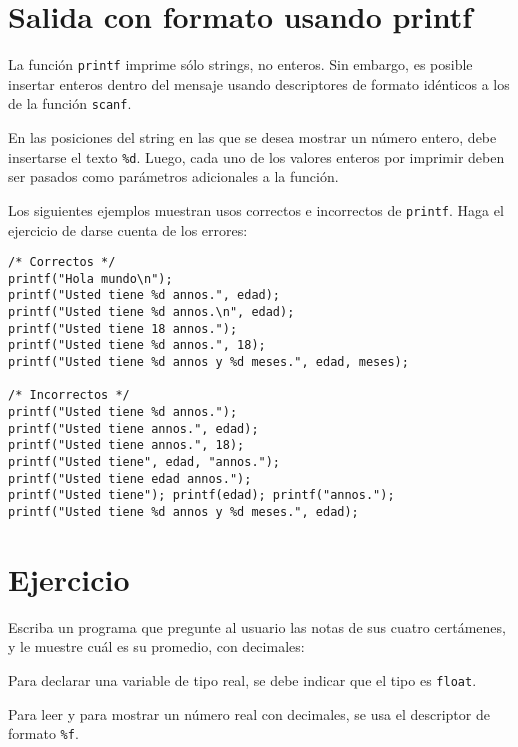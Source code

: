 \section{Salida con formato usando printf}

La función \lstinline!printf! imprime sólo strings, no enteros. Sin
embargo, es posible insertar enteros dentro del mensaje usando
descriptores de formato idénticos a los de la función \lstinline!scanf!.

En las posiciones del string en las que se desea mostrar un número
entero, debe insertarse el texto \lstinline!%d!. Luego, cada uno de los
valores enteros por imprimir deben ser pasados como parámetros
adicionales a la función.

Los siguientes ejemplos muestran usos correctos e incorrectos de
\lstinline!printf!. Haga el ejercicio de darse cuenta de los errores:

\begin{lstlisting}
/* Correctos */
printf("Hola mundo\n");
printf("Usted tiene %d annos.", edad);
printf("Usted tiene %d annos.\n", edad);
printf("Usted tiene 18 annos.");
printf("Usted tiene %d annos.", 18);
printf("Usted tiene %d annos y %d meses.", edad, meses);

/* Incorrectos */
printf("Usted tiene %d annos.");
printf("Usted tiene annos.", edad);
printf("Usted tiene annos.", 18);
printf("Usted tiene", edad, "annos.");
printf("Usted tiene edad annos.");
printf("Usted tiene"); printf(edad); printf("annos.");
printf("Usted tiene %d annos y %d meses.", edad);
\end{lstlisting}

\section{Ejercicio}

Escriba un programa que pregunte al usuario las notas de sus cuatro
certámenes, y le muestre cuál es su promedio, con decimales:

Para declarar una variable de tipo real, se debe indicar que el tipo es
\lstinline!float!.

Para leer y para mostrar un número real con decimales, se usa el
descriptor de formato \lstinline!%f!.
